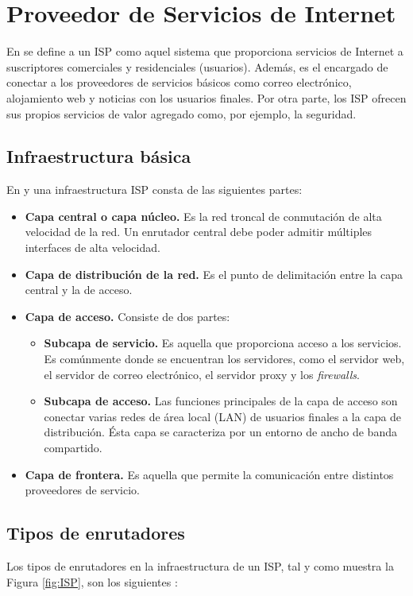 \section {Proveedor de Servicios de Internet} \label{sec:isp}

En \parencite{isp_sun} se define a un ISP como aquel sistema que proporciona
servicios de Internet a suscriptores comerciales y residenciales (usuarios).
Además, es el encargado de conectar a los proveedores de servicios básicos como
correo electrónico, alojamiento web y noticias con los usuarios finales. Por
otra parte, los ISP ofrecen sus propios servicios de valor agregado como, por
ejemplo, la seguridad.

\subsection{Infraestructura básica}

En \parencite{isp_sun} y \parencite{isp_cisco} una infraestructura ISP consta de
las siguientes partes:

\begin{itemize}
\item \textbf{Capa central o capa núcleo.} Es la red troncal de conmutación de
  alta velocidad de la red. Un enrutador central debe poder admitir múltiples
  interfaces de alta velocidad.
\item \textbf{Capa de distribución de la red.} Es el punto de delimitación entre
  la capa central y la de acceso.
\item \textbf {Capa de acceso.} Consiste de dos partes: 
\begin{itemize} 
\item \textbf{Subcapa de servicio.} Es aquella que proporciona acceso a los
  servicios. Es comúnmente donde se encuentran los servidores, como el servidor
  web, el servidor de correo electrónico, el servidor proxy y los
  \textit{firewalls}.
\item \textbf{Subcapa de acceso.} Las funciones principales de la capa de acceso
  son conectar varias redes de área local (LAN) de usuarios finales a la capa de
  distribución. Ésta capa se caracteriza por un entorno de ancho de banda
  compartido.
\end{itemize}
\item \textbf{Capa de frontera.} Es aquella que permite la comunicación entre
  distintos proveedores de servicio.
\end{itemize}

\subsection{Tipos de enrutadores}
Los tipos de enrutadores en la infraestructura de un ISP, tal y como muestra la
Figura \ref{fig:ISP}, son los siguientes \parencite{isp_cisco}:

